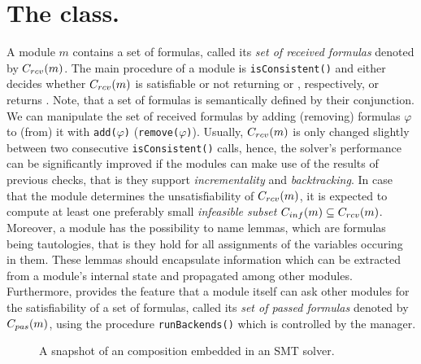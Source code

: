 \section{The \moduleClass class.} A module $m$ contains a set of
formulas, called its \emph{set of received formulas} denoted by 
$C_{rcv}(m)$. The main
procedure of a module  is \texttt{isConsistent()} and either decides
whether $C_{rcv}(m)$ is satisfiable or not returning \SAT or \UNSAT,
respectively, or returns \UNKNOWN. Note, that a set of formulas is
semantically defined by their conjunction. We can manipulate the set
of received formulas by adding (removing) formulas $\varphi$ to (from)
it with \texttt{add($\varphi$)} (\texttt{remove($\varphi$)}). Usually, 
$C_{rcv}(m)$ is only changed slightly between two consecutive 
\texttt{isConsistent()} calls, hence, the solver's performance can be significantly improved if the modules can
make use of the results of previous checks, that is they support
\emph{incrementality} and \emph{backtracking}. In case that the module
determines the unsatisfiability of $C_{rcv}(m)$, it is expected to compute
at least one preferably small \emph{infeasible subset} $C_{inf}(m)\subseteq
C_{rcv}(m)$. Moreover, a module has the possibility to name lemmas, which
are formulas being tautologies, that is they hold for all assignments
of the variables occuring in them. These lemmas should encapsulate
information which can be extracted from a module's internal state and
propagated among other \smtrat modules. Furthermore, \smtrat provides
the feature that a module itself can ask other modules for the
satisfiability of a set of formulas, called its \emph{set
of passed formulas} denoted by $C_{pas}(m)$, using the procedure \texttt{runBackends()} which
is controlled by the manager. 

\begin{figure}[t]
\caption{A snapshot of an \smtrat composition embedded in an SMT solver.}
\begin{center}

\end{center}
\label{fig:framework}
\end{figure}

